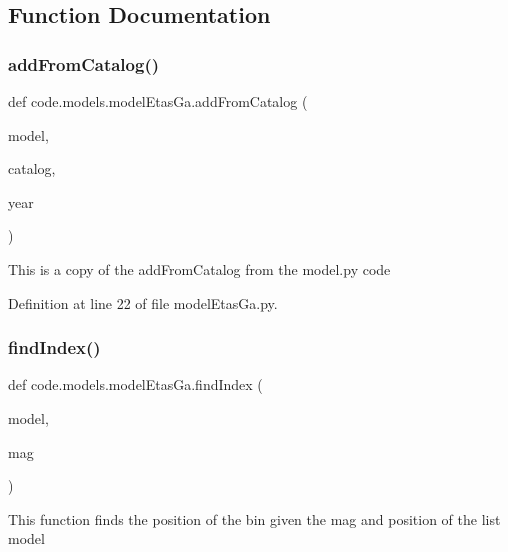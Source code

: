 \subsection{Function Documentation}
\mbox{\label{namespacecode_1_1models_1_1model_etas_ga_a5ebd028c80ed6ec1fa40ad80070ee696}} 
\subsubsection{\texorpdfstring{add\+From\+Catalog()}{addFromCatalog()}}
{\footnotesize\ttfamily def code.\+models.\+model\+Etas\+Ga.\+add\+From\+Catalog (\begin{DoxyParamCaption}\item[{}]{model,  }\item[{}]{catalog,  }\item[{}]{year }\end{DoxyParamCaption})}

\begin{DoxyVerb}This is a copy of the addFromCatalog from the model.py code
\end{DoxyVerb}
 

Definition at line 22 of file model\+Etas\+Ga.\+py.

\mbox{\label{namespacecode_1_1models_1_1model_etas_ga_a1033b39b8da7b8221b627e93fd63f4be}} 
\subsubsection{\texorpdfstring{find\+Index()}{findIndex()}}
{\footnotesize\ttfamily def code.\+models.\+model\+Etas\+Ga.\+find\+Index (\begin{DoxyParamCaption}\item[{}]{model,  }\item[{}]{mag }\end{DoxyParamCaption})}

\begin{DoxyVerb}This function finds the position of the bin given the mag and position of the list model
\end{DoxyVerb}
 

